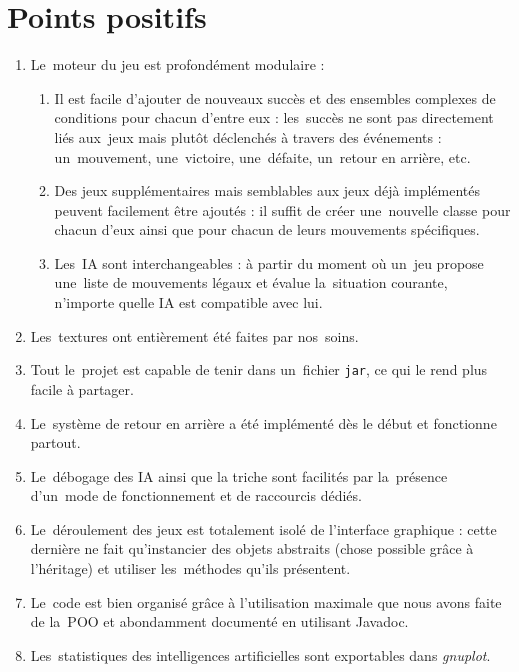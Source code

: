 \section{Points positifs}
\begin{enumerate}
	\item Le~moteur du jeu est profondément modulaire :
	\begin{enumerate}
		\item Il est facile d'ajouter de nouveaux succès et des ensembles complexes 
				de conditions pour chacun d'entre eux : les~succès ne sont pas 
				directement liés aux~jeux mais plutôt déclenchés à travers des événements : 
				un~mouvement, une~victoire, une~défaite, un~retour en arrière, etc.
		\item Des jeux supplémentaires mais semblables aux jeux déjà implémentés peuvent facilement 
				être ajoutés : il suffit de créer une~nouvelle classe pour chacun d'eux ainsi que 
				pour chacun de leurs mouvements spécifiques.
		\item Les~IA sont interchangeables : à partir du moment où un~jeu propose 
				une~liste de mouvements légaux et évalue la~situation courante, 
				n'importe quelle IA est compatible avec lui.
	\end{enumerate}
	
	\item Les~textures ont entièrement été faites par nos~soins.

	\item Tout le~projet est capable de tenir dans un~fichier \texttt{jar}, ce qui le rend plus facile à partager.

	\item Le~système de retour en arrière a été implémenté dès le début et fonctionne partout.

	\item Le~débogage des IA ainsi que la triche sont facilités par la~présence d'un~mode de fonctionnement et de raccourcis dédiés.

	\item Le~déroulement des jeux est totalement isolé de l'interface graphique : cette dernière 
			ne fait qu'instancier des objets abstraits (chose possible grâce à l'héritage) et 
			utiliser les~méthodes qu'ils présentent. 

	\item Le~code est bien organisé grâce à l'utilisation maximale que nous avons faite de la~POO et abondamment documenté en utilisant Javadoc.
	
	\item Les~statistiques des intelligences artificielles sont exportables dans \textit{gnuplot}.
\end{enumerate}